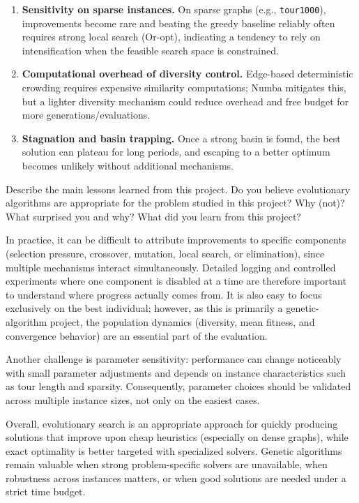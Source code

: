 \documentclass[a4paper,10pt]{article}
\newcommand{\ReplaceMe}[1]{{\color{blue}#1}}
\begin{document}
\begin{enumerate}
  \item \textbf{Sensitivity on sparse instances.}
  On sparse graphs (e.g., \texttt{tour1000}), improvements become rare and beating the greedy baseline reliably often requires strong local search (Or-opt), indicating a tendency to rely on intensification when the feasible search space is constrained.

  \item \textbf{Computational overhead of diversity control.}
  Edge-based deterministic crowding requires expensive similarity computations; Numba mitigates this, but a lighter diversity mechanism could reduce overhead and free budget for more generations/evaluations.

  \item \textbf{Stagnation and basin trapping.}
  Once a strong basin is found, the best solution can plateau for long periods, and escaping to a better optimum becomes unlikely without additional mechanisms.
\end{enumerate}

\ReplaceMe{Describe the main lessons learned from this project. Do you believe evolutionary algorithms are appropriate for the problem studied in this project? Why (not)? What surprised you and why? What did you learn from this project?}

In practice, it can be difficult to attribute improvements to specific components (selection pressure, crossover,
mutation, local search, or elimination), since multiple mechanisms interact simultaneously. Detailed logging and
controlled experiments where one component is disabled at a time are therefore important to understand where
progress actually comes from. It is also easy to focus exclusively on the best individual; however, as this is
primarily a genetic-algorithm project, the population dynamics (diversity, mean fitness, and convergence
behavior) are an essential part of the evaluation.

Another challenge is parameter sensitivity: performance can change noticeably with small parameter adjustments
and depends on instance characteristics such as tour length and sparsity. Consequently, parameter choices should
be validated across multiple instance sizes, not only on the easiest cases.

Overall, evolutionary search is an appropriate approach for quickly producing solutions that improve upon cheap
heuristics (especially on dense graphs), while exact optimality is better targeted with specialized solvers.
Genetic algorithms remain valuable when strong problem-specific solvers are unavailable, when robustness across
instances matters, or when good solutions are needed under a strict time budget.
\end{document}
